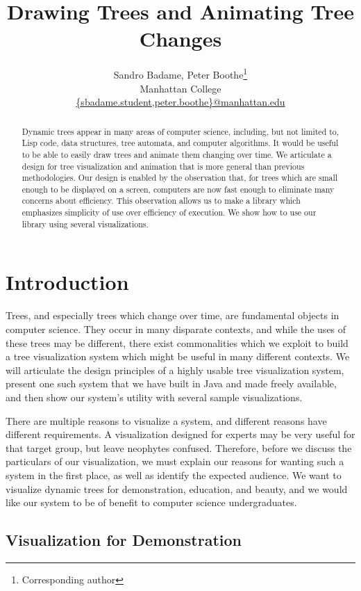 \documentclass{article}
\title{Drawing Trees and Animating Tree Changes}
\author{Sandro Badame, Peter Boothe\footnote{Corresponding author}\\
 Manhattan College\\
\url{{sbadame.student,peter.boothe}@manhattan.edu}}
\begin{document}
\maketitle

\begin{abstract} Dynamic trees appear in many areas of computer science,
including, but not limited to, Lisp code, data structures, tree automata, and
computer algorithms.  It would be useful to be able to easily draw trees and
animate them changing over time.  We articulate a design for tree
visualization and animation that is more general than previous methodologies.
Our design is enabled by the observation that, for trees which are small enough
to be displayed on a screen, computers are now fast enough to eliminate many
concerns about efficiency.  This observation allows us to make a library which
emphasizes simplicity of use over efficiency of execution.  We show how to use  our
library using several visualizations.\end{abstract}

\section{Introduction}
Trees, and especially trees which change over time, are fundamental objects in
computer science.  They occur in many disparate contexts, and while the uses of
these trees may be different, there exist commonalities which we exploit to
build a tree visualization system which might be useful in many different
contexts.  We will articulate the design principles of a highly usable
tree visualization system, present one such system that we have built in Java
and made freely available, and then show our system's utility with
several sample visualizations.

There are multiple reasons to visualize a system, and different reasons have
different requirements.  A visualization designed for experts may be very
useful for that target group, but leave neophytes confused.  Therefore, before
we discuss the particulars of our visualization, we must explain our reasons
for wanting such a system in the first place, as well as identify the expected
audience.  We want to visualize dynamic trees for demonstration, education, and
beauty, and we would like our system to be of benefit to computer
science undergraduates.

\subsection{Visualization for Demonstration}
\end{document}
